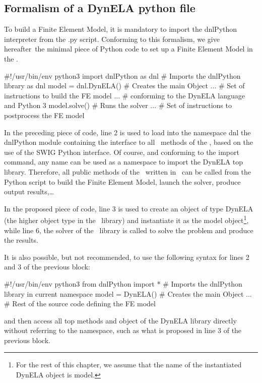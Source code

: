 \subsection{Formalism of a DynELA python file}

To build a Finite Element Model, it is mandatory to import the \textsf{dnlPython} interpreter from the \textsf{.py} script. Conforming to this formalism, we give hereafter the minimal piece of Python code to set up a Finite Element Model in the \DynELA.

\begin{PythonListing}
#!/usr/bin/env python3
import dnlPython as dnl # Imports the dnlPython library as dnl
model = dnl.DynELA()    # Creates the main Object
...                     # Set of instructions to build the FE model
...                     # conforming to the DynELA language and Python 3
model.solve()           # Runs the solver
...                     # Set of instructions to postprocess the FE model
\end{PythonListing}

In the preceding piece of code, line 2 is used to load into the namespace \textsf{dnl} the \textsf{dnlPython} module containing the interface to all \Cpp~methods of the \DynELA, based on the use of the SWIG Python interface. Of course, and conforming to the \textsf{import} command, any name can be used as a namespace to import the DynELA top library. Therefore, all public methods of the \DynELA~written in \Cpp~can be called from the Python script to build the Finite Element Model, launch the solver, produce output results,\ldots

In the proposed piece of code, line 3 is used to create an object of type \textsf{DynELA} (the higher object type in the \DynELA~library) and instantiate it as the \textsf{model} object\footnote{For the rest of this chapter, we assume that the name of the instantiated \textsf{DynELA} object is \textsf{model}.}, while line 6, the solver of the \DynELA~library is called to solve the problem and produce the results.

It is also possible, but not recommended, to use the following syntax for lines 2 and 3 of the previous block:
\begin{PythonListing}
#!/usr/bin/env python3
from dnlPython import * # Imports the dnlPython library in current namespace
model = DynELA()        # Creates the main Object
...                     # Rest of the source code defining the FE model
\end{PythonListing}
and then access all top methods and object of the DynELA library directly without referring to the namespace, such as what is proposed in line 3 of the previous block.

